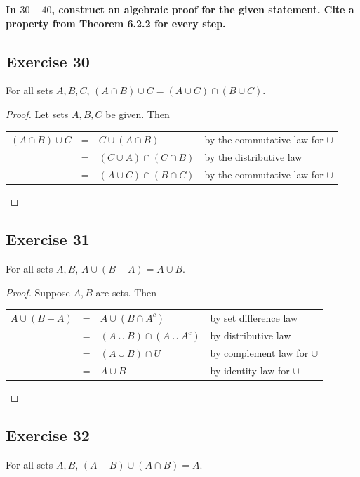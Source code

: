 \documentclass[14pt]{extarticle}
\newcommand{\cy}{\color{cyan}}
\begin{document}
{\bf \cy In $30-40$, construct an algebraic proof for the given statement. Cite a property from Theorem 6.2.2 for every step.}

\subsection{Exercise 30}
For all sets $A, B, C$, \((A \cap B) \cup C = (A \cup C) \cap (B \cup C)\).

\begin{proof}
Let sets $A,B,C$ be given. Then
\begin{center}
\begin{tabular}{rcll}
\((A \cap B) \cup C\) & = & \(C \cup (A \cap B)\) & {\cy by the commutative law for $\cup$} \\
& = & \((C \cup A) \cap (C \cap B)\) & {\cy by the distributive law} \\
& = & \((A \cup C) \cap (B \cap C)\) & {\cy by the commutative law for $\cup$}
\end{tabular}
\end{center}
\end{proof}

\subsection{Exercise 31}
For all sets $A, B$, \(A \cup (B - A) = A \cup B\).

\begin{proof}
Suppose $A,B$ are sets. Then
\begin{center}
\begin{tabular}{rcll}
\(A \cup (B - A)\) & = & \(A \cup (B \cap A^c)\) & {\cy by set difference law} \\
\(\) & = & \((A \cup B) \cap (A \cup A^c)\) & {\cy by distributive law} \\
\(\) & = & \((A \cup B) \cap U\) & {\cy by complement law for $\cup$} \\
\(\) & = & \(A \cup B\) & {\cy by identity law for $\cup$}
\end{tabular}
\end{center}
\end{proof}

\subsection{Exercise 32}
For all sets $A, B$, \((A - B) \cup (A \cap B) = A\).
\end{document}
